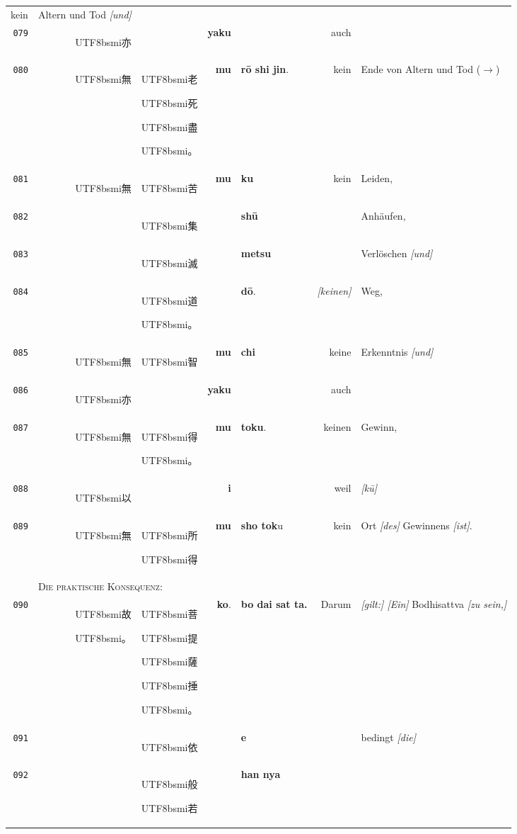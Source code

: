 \documentclass[
DIV=calc,
BCOR=5mm,
11pt,
headings=small,
oneside,
bibtotocnumbered]{scrartcl}
\newcommand{\cnbsmi}[1]{\begin{CJK}{UTF8}{bsmi}#1\end{CJK}}
\begin{document}
\begin{center}
\begin{tabular}{r|rl|rl|rl}
  \textrm{kein} & \textrm{Altern und Tod \emph{[und]}} \\
{\tiny\texttt{079}}&
  \cnbsmi{亦} & ~ &
  \textbf{yaku} & ~ &
  \textrm{auch} & ~ \\
{\tiny\texttt{080}}&
  \cnbsmi{無} & \cnbsmi{老} \cnbsmi{死} \cnbsmi{盡} \cnbsmi{。} &
  \textbf{mu} &
  \textbf{rō shi jin}. &
  \textrm{kein} & \textrm{Ende von Altern und Tod {\tiny ($\rightarrow$)}}\\
\hline
{\tiny\texttt{081}}&
  \cnbsmi{無} & \cnbsmi{苦} & 
  \textbf{mu} & \textbf{ku} &
  \textrm{kein} & \textrm{Leiden,} \\  
{\tiny\texttt{082}}&
  ~ & \cnbsmi{集} &
  ~ & \textbf{shū} & 
  ~ & \textrm{Anhäufen,} \\  
{\tiny\texttt{083}}&
  ~ & \cnbsmi{滅} &
  ~ & \textbf{metsu} & 
  ~ & \textrm{Verlöschen \emph{[und]}} \\  
{\tiny\texttt{084}}&
  ~ & \cnbsmi{道} \cnbsmi{。} & 
  ~ & \textbf{dō}. &
  \textrm{\emph{[keinen]}} & \textrm{Weg,} \\
\hdashline 
{\tiny\texttt{085}}&
  \cnbsmi{無} & \cnbsmi{智} &
  \textbf{mu} & \textbf{chi} &
  \textrm{keine} & \textrm{Erkenntnis \emph{[und]}} \\  
{\tiny\texttt{086}}&
  \cnbsmi{亦} & ~ &
  \textbf{yaku} & ~ &
  \textrm{auch} & ~ \\
{\tiny\texttt{087}}&
  \cnbsmi{無} & \cnbsmi{得} \cnbsmi{。} &
  \textbf{mu} & \textbf{toku}. &
  \textrm{keinen} & \textrm{Gewinn}, \\  
{\tiny\texttt{088}}&
  \cnbsmi{以} & ~ &
  \textbf{i} & ~ &
  \textrm{weil} &  \textrm{\emph{[kū]}} \\  
{\tiny\texttt{089}}&
  \cnbsmi{無} & \cnbsmi{所} \cnbsmi{得}  &
  \textbf{mu} & \textbf{sho tok}\tiny{u}  &
  \textrm{kein} & \textrm{Ort \emph{[des]} Gewinnens \emph{[ist]}.} \\
\hline
  ~ & \multicolumn{6}{l}{\textsc{Die praktische Konsequenz:}}\\
\hline
{\tiny\texttt{090}}&
  \cnbsmi{故}\cnbsmi{。} & 
    \cnbsmi{菩} \cnbsmi{提} \cnbsmi{薩} \cnbsmi{捶}\cnbsmi{。}  &
  \textbf{ko}. & \textbf{bo dai sat ta.} &
  \textrm{Darum} & 
    \textrm{\emph{[gilt:] [Ein]} Bodhisattva \emph{[zu sein,]}}\\
{\tiny\texttt{091}}&
  ~ & \cnbsmi{依} &
  ~ & \textbf{e} & 
  ~ & \textrm{bedingt \emph{[die]}} \\
\newline
{\tiny\texttt{092}}&
  ~ & \cnbsmi{般} \cnbsmi{若}  &
  ~ & \textbf{han nya} &

\end{tabular}
\end{center}
\end{document}

